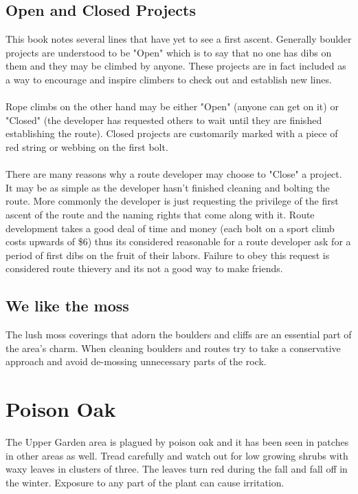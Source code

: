 \subsection*{Open and Closed Projects}
This book notes several lines that have yet to see a first ascent. Generally boulder projects are understood to be "Open" which is to say that no one has dibs on them and they may be climbed by anyone. These projects are in fact included as a way to encourage and inspire climbers to check out and establish new lines.\\
\\
Rope climbs on the other hand may be either "Open" (anyone can get on it) or "Closed" (the developer has requested others to wait until they are finished establishing the route). Closed projects are customarily marked with a piece of red string or webbing on the first bolt.\\
\\
There are many reasons why a route developer may choose to "Close" a project. It may be as simple as the developer hasn't finished cleaning and bolting the route. More commonly the developer is just requesting the privilege of the first ascent of the route and the naming rights that come along with it. Route development takes a good deal of time and money (each bolt on a sport climb costs upwards of \$6) thus its considered reasonable for a route developer ask for a period of first dibs on the fruit of their labors. Failure to obey this request is considered route thievery and its not a good way to make friends.\\
\subsection*{We like the moss}
The lush moss coverings that adorn the boulders and cliffs are an essential part of the area's charm. When cleaning boulders and routes try to take a conservative approach and avoid de-mossing unnecessary parts of the rock.
\section{Poison Oak}
The Upper Garden area is plagued by poison oak and it has been seen in patches in other areas as well. Tread carefully and watch out for low growing shrubs with waxy leaves in clusters of three. The leaves turn red during the fall and fall off in the winter. Exposure to any part of the plant can cause irritation.\\


